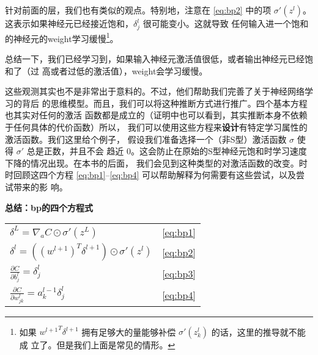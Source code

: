 针对前面的层，我们也有类似的观点。特别地，注意在 \eqref{eq:bp2} 中的项
$\sigma'(z^l)$。这表示如果神经元已经接近饱和，$\delta_j^l$ 很可能变小。这就导致
任何输入进一个饱和的神经元的\gls*{weight}学习缓慢\footnote{如果 ${w^{l+1}}^T
  \delta^{l+1}$ 拥有足够大的量能够补偿 $\sigma'(z_k^l)$ 的话，这里的推导就不能成
  立了。但是我们上面是常见的情形。}。

总结一下，我们已经学习到，如果输入神经元激活值很低，或者输出神经元已经饱和了（过
  高或者过低的激活值），\gls*{weight}会学习缓慢。

这些观测其实也不是非常出于意料的。不过，他们帮助我们完善了关于神经网络学习的背后
的思维模型。而且，我们可以将这种推断方式进行推广。四个基本方程也其实对任何的激活
函数都是成立的（证明中也可以看到，其实推断本身不依赖于任何具体的代价函数）所以，
我们可以使用这些方程来\textbf{设计}有特定学习属性的激活函数。我们这里给个例子，
假设我们准备选择一个（非S型）激活函数 $\sigma$ 使得 $\sigma'$ 总是正数，并且不会
趋近 $0$。这会防止在原始的S型神经元饱和时学习速度下降的情况出现。在本书的后面，
我们会见到这种类型的对激活函数的改变。时时回顾这四个方程
\eqref{eq:bp1}--\eqref{eq:bp4} 可以帮助解释为何需要有这些尝试，以及尝试带来的影
响。

\begin{center}
  \begin{minipage}{0.7\textwidth}
    \begin{framed}
      \centering
      \textbf{总结：\gls*{bp}的四个方程式}\label{backpropsummary}\\
      \vspace{1.5ex}
      \begin{tabular}{ll}
        $\delta^L = \nabla_a C \odot \sigma'(z^L)$            & \hspace{2cm}\eqref{eq:bp1} \\[1.5ex]
        $\delta^l = ((w^{l+1})^T \delta^{l+1}) \odot \sigma'(z^l)$ & \hspace{2cm}\eqref{eq:bp2} \\[1.5ex]
        $\frac{\partial C}{\partial b^l_j} = \delta^l_j$       & \hspace{2cm}\eqref{eq:bp3} \\[1.5ex]
        $\frac{\partial C}{\partial w^l_{jk}} = a^{l-1}_k \delta^l_j$ & \hspace{2cm}\eqref{eq:bp4}
      \end{tabular}
    \end{framed}
  \end{minipage}
\end{center}

